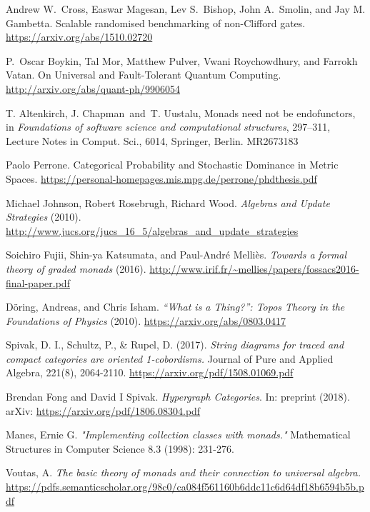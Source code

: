 \documentclass{amsart}
\begin{document}
\begin{thebibliography}{99}
 Andrew W.\ Cross, Easwar Magesan, Lev S.\ Bishop, John A.\ Smolin, and Jay M. Gambetta. Scalable randomised benchmarking of non-Clifford gates. \url{https://arxiv.org/abs/1510.02720}

 P.~Oscar Boykin, Tal Mor, Matthew Pulver, Vwani Roychowdhury, and Farrokh Vatan. On Universal and Fault-Tolerant Quantum Computing. \url{http://arxiv.org/abs/quant-ph/9906054}

 T. Altenkirch, J. Chapman\ and\ T. Uustalu, Monads need not be endofunctors, in {\it Foundations of software science and computational structures}, 297--311, Lecture Notes in Comput. Sci., 6014, Springer, Berlin. MR2673183

 Paolo Perrone. Categorical Probability and Stochastic Dominance in Metric Spaces. \url{https://personal-homepages.mis.mpg.de/perrone/phdthesis.pdf}

 Michael Johnson, Robert Rosebrugh, Richard Wood. \emph{
Algebras and Update Strategies} (2010). \url{http://www.jucs.org/jucs_16_5/algebras_and_update_strategies}

 Soichiro Fujii, Shin-ya Katsumata, and Paul-André Melliès. \emph{Towards a formal theory of graded monads} (2016). \url{http://www.irif.fr/~mellies/papers/fossacs2016-final-paper.pdf}

 Döring, Andreas, and Chris Isham. \emph{“What is a Thing?”: Topos Theory in the Foundations of Physics} (2010). \url{https://arxiv.org/abs/0803.0417}

 Spivak, D. I., Schultz, P., \& Rupel, D. (2017). \emph{String diagrams for traced and compact categories are oriented 1-cobordisms.} Journal of Pure and Applied Algebra, 221(8), 2064-2110. \url{https://arxiv.org/pdf/1508.01069.pdf}

 Brendan Fong and David I
  Spivak. \emph{Hypergraph Categories}. In: preprint (2018).  arXiv:
  \url{https://arxiv.org/pdf/1806.08304.pdf}

 Manes, Ernie G. \emph{"Implementing collection
  classes with monads."} Mathematical Structures in Computer Science
  8.3 (1998): 231-276.

 Voutas, A. \emph{The basic theory of monads and their connection to universal algebra.} \url{https://pdfs.semanticscholar.org/98c0/ca084f561160b6ddc11c6d64df18b6594b5b.pdf}


\end{thebibliography}
\end{document}
